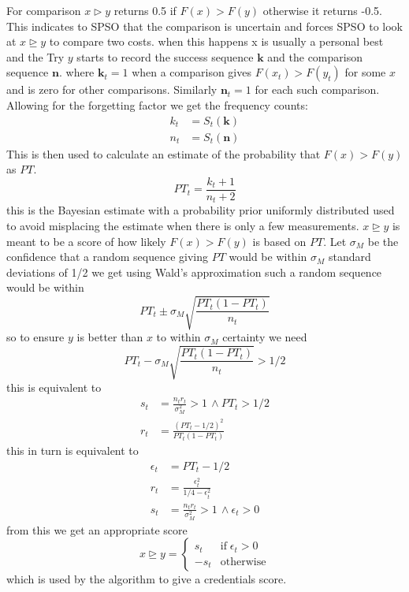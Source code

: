 \documentclass[a4paper,oneside,english]{book}
\numberwithin{equation}{section}
\numberwithin{figure}{section}
\begin{document}
For  comparison $x \rhd y$ returns 0.5 if $ F(x) > F(y)$ otherwise it returns -0.5. This indicates to SPSO that the comparison is uncertain and forces SPSO to look at $x \unrhd y$ to compare two costs. when this happens x is usually a personal best  and  the Try $y$ starts to record the success sequence $\mathbf{k}$ and the comparison sequence $\mathbf{n}$. where $\mathbf{k}_t =1$ when a comparison gives $F(x_t)>F(y_t)$ for some $x$ and is zero for other comparisons. Similarly $\mathbf{n}_t=1 $ for each such comparison. Allowing for the forgetting factor we get the frequency counts:
\begin{align}
	k_t &= S_t(\mathbf{k})\\
	n_t &= S_t(\mathbf{n})
\end{align}
This is then used to calculate an estimate of the probability that $F(x)>F(y)$  as $PT$.
\begin{equation}\label{eqn:success-estimate}
	PT_t=\frac{k_t+1}{n_t+2}
\end{equation}
this is the Bayesian estimate   with a probability prior uniformly distributed used to avoid misplacing the estimate when there is only a few measurements. $x \unrhd y$ is meant to be a score of how likely $F(x) > F(y)$  is based on $PT$. Let $\sigma_M$ be the confidence that a random sequence giving  $PT$ would be within $\sigma_M$ standard deviations of 1/2 we get using Wald's approximation such a random sequence would be within 
\begin{equation}
	PT_t \pm \sigma_M\sqrt{\frac{PT_t(1-PT_t)}{n_t}}
\end{equation}
so to ensure $y$ is better than $x$ to within $\sigma_M$ certainty we need 
\begin{equation}\label{eqn:score-threshold}
	PT_t-\sigma_M \sqrt{\frac{PT_t(1-PT_t)}{n_t}} >1/2
\end{equation}
this is equivalent to 
\begin{align}
	s_t&= \frac{n_t r_t}{\sigma^2_M }>1 \, \wedge PT_t> 1/2\\
	r_t&= \frac{(PT_t-1/2)^2}{PT_t(1-PT_t)} 
\end{align}
this in turn is equivalent to
\begin{align}
	\epsilon_t &= PT_t-1/2 \\
	r_t &=\frac{ \epsilon^2_t}{1/4 - \epsilon^2_t} \\
	s_t&=\frac{n_t r_t}{\sigma^2_M }>1 \, \wedge \epsilon_t > 0
\end{align} 
from this we get an appropriate score
\begin{equation}\label{eqn:candidate-score}
	x \unrhd y = \left\lbrace 
	\begin{array}{cc}
		s_t &\mathrm{ if}\; \epsilon_t >0\\
		-s_t& \mathrm{otherwise}
	\end{array}\right .
\end{equation}
which is used by the algorithm to give a  credentials score.      
\end{document}

